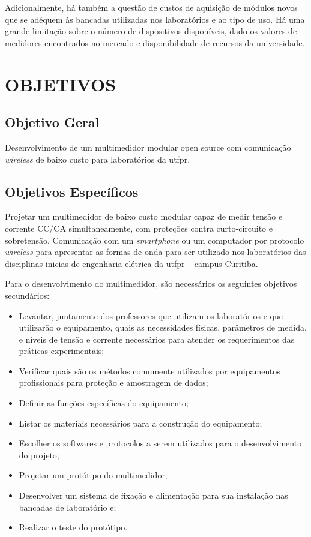 Adicionalmente, há também a questão de custos de aquisição de módulos novos que se adéquem às bancadas utilizadas nos laboratórios e ao tipo de uso. Há uma grande limitação sobre o número de dispositivos disponíveis, dado os valores de medidores encontrados no mercado e disponibilidade de recursos da universidade.

\section{OBJETIVOS}\label{sec:objetivos}

\subsection{Objetivo Geral}\label{sec:objgeral}
Desenvolvimento de um multimedidor modular open source com comunicação \textit{wireless} de baixo custo para laboratórios da \gls{utfpr}.


\subsection{Objetivos Específicos}\label{sec:objespec}
Projetar um multimedidor de baixo custo modular capaz de medir tensão e corrente \gls{CC}/\gls{CA} simultaneamente, com proteções contra curto-circuito e sobretensão. Comunicação com um \textit{smartphone} ou um computador por protocolo \textit{wireless} para apresentar as formas de onda para ser utilizado nos laboratórios das disciplinas inicias de engenharia elétrica da \gls{utfpr} – campus Curitiba.

Para o desenvolvimento do multimedidor, são necessários os seguintes objetivos secundários:

\begin{itemize}
    \item Levantar, juntamente dos professores que utilizam os laboratórios e que utilizarão o equipamento, quais as necessidades físicas, parâmetros de medida, e níveis de tensão e corrente necessários para atender os requerimentos das práticas experimentais;
    \item Verificar quais são os métodos comumente utilizados por equipamentos profissionais para proteção e amostragem de dados;
    \item Definir as funções específicas do equipamento;
    \item Listar os materiais necessários para a construção do equipamento;
    \item Escolher os softwares e protocolos a serem utilizados para o desenvolvimento do projeto;
    \item Projetar um protótipo do multimedidor;
    \item Desenvolver um sistema de fixação e alimentação para sua instalação nas bancadas de laboratório e;
    \item Realizar o teste do protótipo.
\end{itemize}

